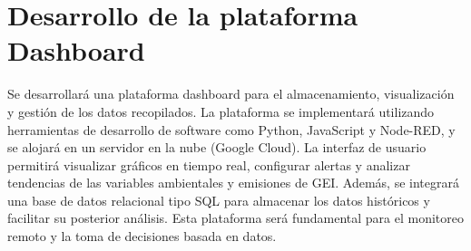 \section{Desarrollo de la plataforma  Dashboard}

Se desarrollará una plataforma dashboard para el almacenamiento, visualización y gestión de los datos recopilados. La plataforma se implementará utilizando herramientas de desarrollo de software como Python, JavaScript y Node-RED, y se alojará en un servidor en la nube (Google Cloud). La interfaz de usuario permitirá visualizar gráficos en tiempo real, configurar alertas y analizar tendencias de las variables ambientales y emisiones de GEI. Además, se integrará una base de datos relacional tipo SQL para almacenar los datos históricos y facilitar su posterior análisis. Esta plataforma será fundamental para el monitoreo remoto y la toma de decisiones basada en datos.